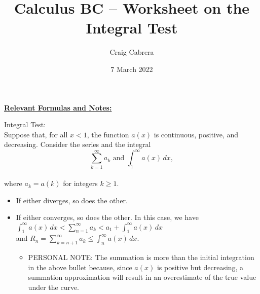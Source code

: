 \documentclass[10pt,letterpaper]{report}
\title{Calculus BC -- Worksheet on the Integral Test}
\author{Craig Cabrera}
\date{7 March 2022}
\begin{document}
\maketitle
\begin{center}
  \textbf{\underline{Relevant Formulas and Notes:}}
\end{center}

\noindent Integral Test: \\

\noindent Suppose that, for all $x < 1$, the function $a(x)$ is continuous, positive, and decreasing. Consider the series and the integral \\

$$\sum_{k=1}^{\infty}{a_{k}} \text{ and } \int_{1}^{\infty}{a(x)}\,dx,$$ \\

\noindent where $a_{k}=a(k)$ for integers $k\geq 1$. 

\begin{itemize}
  \item{If either diverges, so does the other. \\}
  \item{If either converges, so does the other. In this case, we have \\
  
  $\int_{1}^{\infty}{a(x)}\,dx < \sum_{n=1}^{\infty}{a_{k}} < a_{1} + \int_{1}^{\infty}{a(x)}\,dx$ \\
  
  and $ R_{n}=\sum_{k=n+1}^{\infty}{a_{k}}\leq \int_{n}^{\infty}{a(x)}\,dx$. \\}
  \begin{itemize}
    \item{PERSONAL NOTE: The summation is more than the initial integration in the above bullet because, since $a(x)$ is positive but decreasing, a summation approximation will result in an overestimate of the true value under the curve. }
  \end{itemize}
\end{itemize}


\pagebreak 
\end{document}
